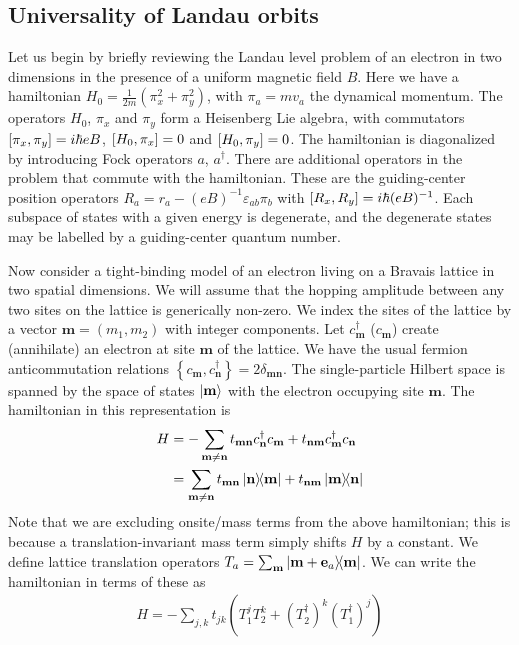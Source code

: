 \documentclass[aps,prb,twocolumn,letterpaper,twoside,nobalancelastpage,groupedaddress,amsmath,amssymb,floatfix,citeautoscript]{revtex4-1}
\begin{document}
\subsection{Universality of Landau orbits}
Let us begin by briefly reviewing the Landau level problem of an electron in two dimensions in the presence of a uniform magnetic field $B$. Here we have a hamiltonian $H_0 = \frac{1}{2m}\left(\pi_x^2 + \pi_y^2\right)$, with $\pi_a = m v_a$ the dynamical momentum. The operators $H_0$, $\pi_x$ and $\pi_y$ form a Heisenberg Lie algebra, with commutators $\comm{\pi_x}{\pi_y} = i\hbar e B$, $\comm{H_0}{\pi_x} = 0$ and $\comm{H_0}{\pi_y} = 0$. The hamiltonian is diagonalized by introducing Fock operators $a$, $a^{\dagger}$. There are additional operators in the problem that commute with the hamiltonian. These are the guiding-center position operators $R_a = r_a - (eB)^{-1}\varepsilon_{ab}\pi_b$ with $\comm{R_x}{R_y} = i\hbar(eB)^{-1}$. Each subspace of states with a given energy is degenerate, and the degenerate states may be labelled by a guiding-center quantum number.

Now consider a tight-binding model of an electron living on a Bravais lattice in two spatial dimensions. 
We will assume that the hopping amplitude between any two sites on the lattice is generically non-zero. We index the sites of the lattice by a vector $\mathbf{m} = (m_1, m_2)$ with integer components. Let $c^{\dag}_{\mathbf{m}}$ ($c_{\mathbf{m}}$) create (annihilate) an electron at site $\mathbf{m}$ of the lattice. We have the usual fermion anticommutation relations $\left\{c_{\mathbf{m}},c_{\mathbf{n}}^{\dag}\right\} = 2\delta_{\mathbf{m} \mathbf{n}}$. The single-particle Hilbert space is spanned by the space of states $\ket{\mathbf{m}}$ with the electron occupying site $\mathbf{m}$. The hamiltonian in this representation is
\begin{align*}
H &= -\sum_{\mathbf{m}\neq \mathbf{n}} t_{\mathbf{m}\mathbf{n}} c^{\dag}_\mathbf{n} c_\mathbf{m}  + t_{\mathbf{n}\mathbf{m}} c^{\dag}_{\mathbf{m}} c_{\mathbf{n}}\\  &= \sum_{\mathbf{m}\neq \mathbf{n}} t_{\mathbf{m}\mathbf{n}} \dyad{\mathbf{n}}{\mathbf{m}} + t_{\mathbf{n}\mathbf{m}} \dyad{\mathbf{m}}{\mathbf{n}}
\end{align*}
Note that we are excluding onsite/mass terms from the above hamiltonian; this is because a translation-invariant mass term simply shifts $H$ by a constant. We define lattice translation operators $T_a = \sum_{\bfm} \dyad{\mathbf{m} + \mathbf{e}_a}{\mathbf{m}}$. We can write the hamiltonian in terms of these as
\begin{align}
\label{eq-b0-lattice-hamiltonian}
H = -\sum_{j,k} t_{jk} \left(T_1^j T_2^k + (T^{\dag}_2)^{k} (T^{\dag}_1)^{j}\right)
\end{align}
\end{document}
